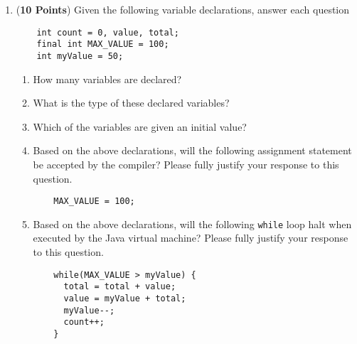 \documentclass[12pt]{article}
\begin{document}
\begin{enumerate}
\item ({\bf 10 Points}) Given the following variable declarations, answer each question

\hspace*{.25in}
\begin{minipage}{6in}
  \begin{lstlisting}
    int count = 0, value, total;
    final int MAX_VALUE = 100;
    int myValue = 50;
  \end{lstlisting}
\end{minipage}

\begin{enumerate}

\item How many variables are declared?
  \vspace*{.75in}

\item What is the type of these declared variables?
  \vspace*{.75in}

\item Which of the variables are given an initial value?
  \vspace*{.75in}

\item Based on the above declarations, will the following assignment
  statement be accepted by the compiler?  Please fully justify your
  response to this question.


\begin{minipage}{6in}
  \begin{lstlisting}
    MAX_VALUE = 100;
  \end{lstlisting}
\end{minipage}
  \vspace*{1in}

\item Based on the above declarations, will the following {\tt while} loop halt when executed by the Java virtual
  machine? Please fully justify your response to this question.

\begin{minipage}{6in}
  \begin{lstlisting}
    while(MAX_VALUE > myValue) {
      total = total + value;
      value = myValue + total;
      myValue--;
      count++;
    }
  \end{lstlisting}
\end{minipage}

\end{enumerate}

\end{enumerate}
\end{document}
